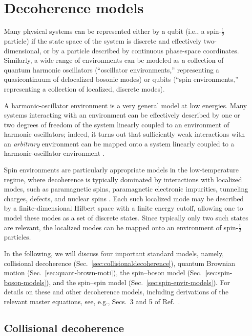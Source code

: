 \documentclass[3p,sort&compress]{elsarticle}
\begin{document}
\section{\label{sec:decmodels}Decoherence models}

Many physical systems can be represented either by a qubit (i.e., a spin-$\frac{1}{2}$ particle) if the state space of the system is discrete and effectively two-dimensional, or by a particle described by continuous phase-space coordinates. Similarly, a wide range of environments can be modeled as a collection of quantum harmonic oscillators (``oscillator environments,'' representing a quasicontinuum of delocalized bosonic modes) or qubits (``spin environments,'' representing a collection of localized, discrete modes). 

A harmonic-oscillator environment is a very general model at low energies. Many systems interacting with an environment can be effectively described by one or two degrees of freedom of the system linearly coupled to an environment of harmonic oscillators; indeed, it turns out that sufficiently weak interactions with an \emph{arbitrary} environment can be mapped onto a system linearly coupled to a harmonic-oscillator environment \cite{Feynman:1963:jj,Caldeira:1983:gv}.

Spin environments are particularly appropriate models in the low-temperature regime, where decoherence is typically dominated by interactions with localized modes, such as paramagnetic spins, paramagnetic electronic impurities, tunneling charges, defects, and nuclear spins \cite{Dube:2001:zz,Prokofev:2000:zz,Lounasmaa:1974:yb}. Each such localized mode may be described by a finite-dimensional Hilbert space with a finite energy cutoff, allowing one to model these modes as a set of discrete states. Since typically only two such states are relevant, the localized modes can be mapped onto an environment of spin-$\frac{1}{2}$ particles.

In the following, we will discuss four important standard models, namely, collisional decoherence (Sec.~\ref{sec:collisionaldecoherence}), quantum Brownian motion (Sec.~\ref{sec:quant-brown-moti}), the spin--boson model (Sec.~\ref{sec:spin-boson-models}), and the spin--spin model (Sec.~\ref{sec:spin-envir-models}). For details on these and other decoherence models, including derivations of the relevant master equations, see, e.g., Secs.~3 and 5 of Ref.~\cite{Schlosshauer:2007:un}. 

\subsection{\label{sec:collisionaldecoherence}Collisional decoherence}
\end{document}
